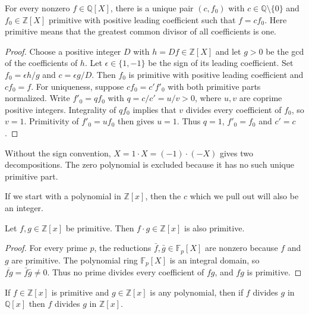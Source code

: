 \begin{lemma}
For every nonzero $f\in\mathbb Q[X]$, there is a unique pair
$(c,f_0)$ with $c\in\mathbb Q\setminus\{0\}$ and $f_0\in\mathbb Z[X]$
primitive with positive leading coefficient such that $f=cf_0$.
Here primitive means that the greatest common divisor of all coefficients is one.
\end{lemma}
\begin{proof}
Choose a positive integer $D$ with $h=Df\in\mathbb Z[X]$ and let $g>0$
be the gcd of the coefficients of $h$. Let $\epsilon\in\{1,-1\}$ be the
sign of its leading coefficient. Set $f_0=\epsilon h/g$ and $c=\epsilon g/D$.
Then $f_0$ is primitive with positive leading coefficient and $cf_0=f$.
For uniqueness, suppose $cf_0=c'f'_0$ with both primitive parts normalized.
Write $f'_0=qf_0$ with $q=c/c'=u/v>0$, where $u,v$ are coprime positive integers.
Integrality of $qf_0$ implies that $v$ divides every coefficient of $f_0$,
so $v=1$. Primitivity of $f'_0=uf_0$ then gives $u=1$.
Thus $q=1$, $f'_0=f_0$ and $c'=c$.
\end{proof}
\begin{remark}
Without the sign convention, $X=1\cdot X=(-1)\cdot(-X)$ gives two decompositions.
The zero polynomial is excluded because it has no such unique primitive part.
\end{remark}

\begin{lemma}
If we start with a polynomial in $\mathbb{Z}[x]$, then the $c$ which we pull out will also be an integer.
\end{lemma}

\begin{lemma}
Let $f,g \in \mathbb{Z}[x]$ be primitive. Then $f\cdot g \in \mathbb{Z}[x]$ is also primitive.
\end{lemma}

\begin{proof}
For every prime $p$, the reductions $\bar f,\bar g\in\mathbb F_p[X]$
are nonzero because $f$ and $g$ are primitive. The polynomial ring
$\mathbb F_p[X]$ is an integral domain, so $\overline{fg}=\bar f\bar g\ne0$.
Thus no prime divides every coefficient of $fg$, and $fg$ is primitive.
\end{proof}

\begin{lemma}
If $f \in \mathbb{Z}[x]$ is primitive and $g \in \mathbb{Z}[x]$ is any polynomial, then if $f$ divides $g$ in $\mathbb{Q}[x]$ then $f$ divides $g$ in $\mathbb{Z}[x]$.
\end{lemma}

